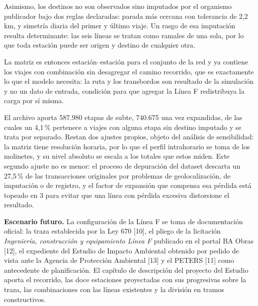 \documentclass{article}
\begin{document}
Asimismo, los destinos no son observados sino
imputados por el organismo publicador bajo dos reglas declaradas: parada más cercana con tolerancia de
2,2 km, y simetría diaria del primer y último viaje. Un rasgo de esa imputación resulta determinante: las seis líneas se tratan como ramales de una sola, por lo
que toda estación puede ser origen y destino de cualquier otra.

La matriz es entonces estación--estación para el
conjunto de la red y ya contiene los viajes con combinación sin desagregar el camino recorrido, que es
exactamente lo que el modelo necesita: la ruta y los transbordos son resultado de la simulación y no un dato
de entrada, condición para que agregar la Línea F redistribuya la carga por sí misma.

El archivo aporta
587.980 etapas de subte, 740.675 una vez expandidas, de las cuales un 4,1\,\% pertenece a viajes con alguna
etapa sin destino imputado y se trata por separado. Restan dos ajustes propios, objeto del análisis de
sensibilidad: la matriz tiene resolución horaria, por lo que el perfil intrahorario se toma de los
molinetes, y su nivel absoluto se escala a los totales que estos miden. Este segundo ajuste no es menor: el
proceso de depuración del dataset descarta un 27,5\,\% de las transacciones originales por problemas de
geolocalización, de imputación o de registro, y el factor de expansión que compensa esa pérdida está topeado
en 3 para evitar que una línea con pérdida excesiva distorsione el resultado.

\textbf{Escenario futuro.} La configuración de la Línea F se toma de documentación oficial: la traza
establecida por la Ley 670 [10], el pliego de la licitación \textit{Ingeniería, construcción y equipamiento
Línea F} publicado en el portal BA Obras [12], el expediente del Estudio de Impacto Ambiental obtenido por
pedido de vista ante la Agencia de Protección Ambiental [13] y el PETERS [11] como antecedente de
planificación. El capítulo de descripción del proyecto del Estudio aporta el recorrido, las doce estaciones
proyectadas con sus progresivas sobre la traza, las combinaciones con las líneas existentes y la división en
tramos constructivos.
\end{document}
